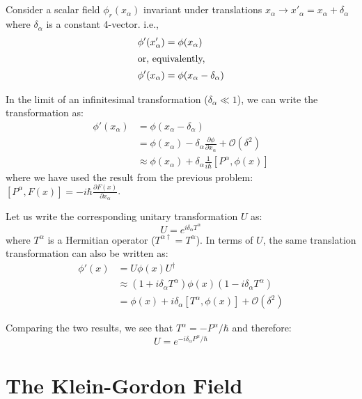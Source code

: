 \documentclass[letterpaper,12pt]{article}
\newenvironment{problem}{\subsection{}\begin{adjustwidth}{0.25in}{}\vspace{-\baselineskip}}{\end{adjustwidth}}
\newcommand{\pder}[2]{\frac{\partial #1}{\partial #2}}
\newcommand{\done}{\tag*{$\blacksquare$}}
\begin{document}
\begin{problem}
Consider a scalar field $\phi_r(x_\alpha)$ invariant under translations $x_\alpha \longrightarrow x'_\alpha = x_\alpha + \delta_\alpha$ where $\delta_\alpha$ is a constant 4-vector. i.e.,
\begin{align*}
	\phi'(x'_\alpha) &= \phi(x_\alpha)		\\
	\intertext{or, equivalently,} 
	\phi'(x_\alpha) &= \phi(x_\alpha - \delta_\alpha)
\end{align*}

In the limit of an infinitesimal transformation ($\delta_\alpha \ll 1$), we can write the transformation as:
\begin{align*}
	\phi'(x_\alpha) &= \phi(x_\alpha - \delta_\alpha)	\\
	&= \phi(x_\alpha) - \delta_\alpha \pder{\phi}{x_\alpha} + \mathcal{O}\left(\delta^2\right)	\\
	&\approx \phi(x_\alpha) + \delta_\alpha\frac{1}{i\hbar}\left[P^\alpha, \phi(x)\right]
\end{align*}
where we have used the result from the previous problem: $\left[P^\alpha, F(x)\right] = -i\hbar\pder{F(x)}{x_\alpha}$.

Let us write the corresponding unitary transformation $U$ as:
\begin{equation*}
U = e^{i\delta_\alpha T^\alpha}
\end{equation*}
where $T^\alpha$ is a Hermitian operator ($T^{\alpha\dagger}=T^\alpha$). In terms of $U$, the same translation transformation can also be written as:
\begin{align*}
	\phi'(x) &= U\phi(x)U^\dagger	\\
	&\approx (1+i\delta_\alpha T^\alpha) \phi(x) (1-i\delta_\alpha T^\alpha)	\\
	&= \phi(x) + i\delta_\alpha\left[T^\alpha, \phi(x)\right] + \mathcal{O}(\delta^2)
\end{align*}

Comparing the two results, we see that $T^\alpha = -P^\alpha / \hbar$ and therefore:
\begin{equation*}
	U = e^{-i\delta_\alpha P^\alpha / \hbar}		\done
\end{equation*}

\end{problem}



\section{The Klein-Gordon Field}
\end{document}
